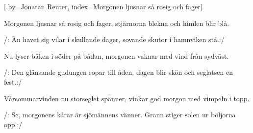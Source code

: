 


[ 	%
	by={Jonatan Reuter},	%
	index={Morgonen ljusnar så rosig och fager}]		%
	
\beginverse*		%
Morgonen ljusnar så rosig och fager,
stjärnorna blekna och himlen blir blå.
\endverse			%

\beginchorus		%
/: Än havet sig vilar i skullande dager,
sovande skutor i hamnviken stå.:/
\endchorus			%

\beginverse*		%
Nu lyser båken i söder på bådan,
morgonen vaknar med vind från sydväst.
\endverse			%

\beginchorus		%
/: Den glänsande gudungen ropar till åden,
dagen blir skön och seglatsen en fest.:/
\endchorus			%

\beginverse*		%
Vårsommarvinden nu storseglet spänner,
vinkar god morgon med vimpeln i topp.
\endverse			%

\beginchorus		%
/: Se, morgonens kårar är sjömännens vänner.
Grann stiger solen ur böljorna opp.:/
\endchorus			%
\endsong			%
